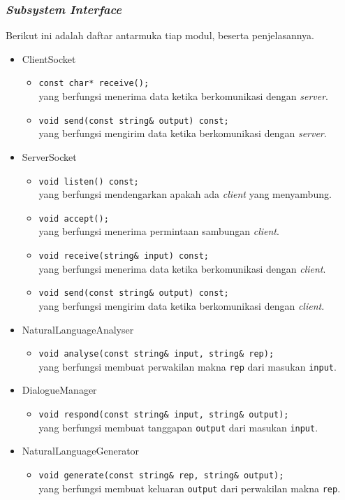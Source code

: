 \subsubsection*{\textit{Subsystem Interface}}
Berikut ini adalah daftar antarmuka tiap modul, beserta penjelasannya.
\begin{itemize}
\item ClientSocket
	\begin{itemize}
	\item\verb!const char* receive();!\\
	yang berfungsi menerima data ketika berkomunikasi dengan \textit{server}.
	\item\verb!void send(const string& output) const;!\\
	yang berfungsi mengirim data ketika berkomunikasi dengan \textit{server}.
	\end{itemize}
\item ServerSocket
	\begin{itemize}
	\item\verb!void listen() const;!\\
	yang berfungsi mendengarkan apakah ada \textit{client} yang menyambung.
	\item\verb!void accept();!\\
	yang berfungsi menerima permintaan sambungan \textit{client}.
	\item\verb!void receive(string& input) const;!\\
	yang berfungsi menerima data ketika berkomunikasi dengan \textit{client}.
	\item\verb!void send(const string& output) const;!\\
	yang berfungsi mengirim data ketika berkomunikasi dengan \textit{client}.
	\end{itemize}
\item NaturalLanguageAnalyser
	\begin{itemize}
	\item\verb!void analyse(const string& input, string& rep);!\\
	yang berfungsi membuat perwakilan makna \texttt{rep} dari masukan \texttt{input}.
	\end{itemize}
\item DialogueManager
	\begin{itemize}
	\item\verb!void respond(const string& input, string& output);!\\
	yang berfungsi membuat tanggapan \texttt{output} dari masukan \texttt{input}.
	\end{itemize}
\item NaturalLanguageGenerator
	\begin{itemize}
	\item\verb!void generate(const string& rep, string& output);!\\
	yang berfungsi membuat keluaran \texttt{output} dari perwakilan makna \texttt{rep}.
	\end{itemize}
\end{itemize}
